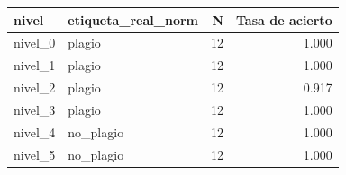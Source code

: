 \begin{tabular}{llrr}
\toprule
nivel & etiqueta\_real\_norm & N & Tasa de acierto \\
\midrule
nivel\_0 & plagio & 12 & 1.000 \\
nivel\_1 & plagio & 12 & 1.000 \\
nivel\_2 & plagio & 12 & 0.917 \\
nivel\_3 & plagio & 12 & 1.000 \\
nivel\_4 & no\_plagio & 12 & 1.000 \\
nivel\_5 & no\_plagio & 12 & 1.000 \\
\bottomrule
\end{tabular}
